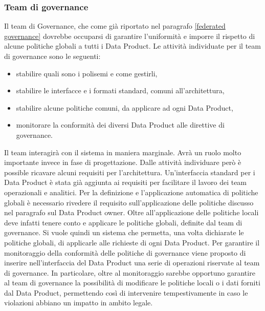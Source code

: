 \documentclass[12pt]{report}
\begin{document}
\subsubsection{Team di governance}
Il team di Governance, che come già riportato nel paragrafo \ref{federated governance} dovrebbe occuparsi di garantire l'uniformità e imporre il rispetto di alcune politiche globali a tutti i Data Product. 
Le attività individuate per il team di governance sono le seguenti:
\begin{itemize}
    \item stabilire quali sono i polisemi e come gestirli,
    \item stabilire le interfacce e i formati standard, comuni all'architettura,
    \item stabilire alcune politiche comuni, da applicare ad ogni Data Product,
    \item monitorare la conformità dei diversi Data Product alle direttive di governance.
\end{itemize}
Il team interagirà con il sistema in maniera marginale. 
Avrà un ruolo molto importante invece in fase di progettazione.
Dalle attività individuare però è possible ricavare alcuni requisiti per l'architettura.
Un'interfaccia standard per i Data Product è stata già aggiunta ai requisiti per facilitare il lavoro dei team operazionali e analitici.
Per la definizione e l'applicazione automatica di politiche globali è necessario rivedere il requisito sull'applicazione delle politiche discusso nel paragrafo sul Data Product owner.
Oltre all'applicazione delle politiche locali deve infatti tenere conto e applicare le politiche globali, definite dal team di governance. 
Si vuole quindi un sistema che permetta, una volta dichiarate le politiche globali, di applicarle alle richieste di ogni Data Product.
Per garantire il monitoraggio della conformità delle politiche di governance viene proposto di inserire nell'interfaccia del Data Product una serie di operazioni riservate al team di governance.
In particolare, oltre al monitoraggio sarebbe opportuno garantire al team di governance la possibilità di modificare le politiche locali o i dati forniti dal Data Product, permettendo così di intervenire tempestivamente in caso le violazioni abbiano un impatto in ambito legale.
\end{document}
